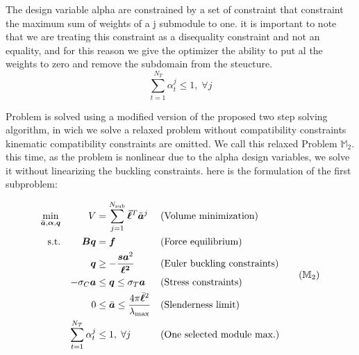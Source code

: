 The design variable alpha are constrained by a set of constraint that constraint the maximum sum of weights of a j submodule to one. it is important to note that we are treating this constraint as a disequality constraint and not an equality, and for this reason we give the optimizer the ability to put al the weights to zero and remove the subdomain from the steucture.
\begin{equation}
    \sum_{t=1}^{N_T} \alpha_t^j \leq 1, \; \forall j 
\end{equation}

Problem  is solved using a modified version of the proposed two step solving algorithm, in wich we solve a relaxed problem without compatibility constraints kinematic compatibility constraints are omitted. We call this relaxed Problem $\mathbb{M}_2$. this time, as the problem is nonlinear due to the alpha design variables, we solve it without linearizing the buckling constraints.  here is the formulation of the first subproblem:

\begin{equation}
    \begin{aligned}
    \min_{\bar{\vect{a}}, \vect{\alpha}, \bm{q}}   && V &= \sum_{j=1}^{N_{\text{sub}}}\vect{\bar{\ell}}^T\tilde{\vect{a}}^j && \textrm{(Volume minimization)}\\
    \textrm{s.t.}   && \bm{B}\bm{q} &= \bm{f} && \textrm{(Force equilibrium)}\\
                    && \bm{q} &\geq -\frac{\bm{s}\bm{a}^2}{\bm{\ell^2}} && \textrm{(Euler buckling constraints)} \\
                    && -\sigma_C\bm{a} &\leq \bm{q} \leq \sigma_T\bm{a} && \textrm{(Stress constraints)} \\
                    && 0 &\leq \bar{\vect{a}} \leq \frac{4 \pi \bar{\vect{\ell}}^2}{\lambda_{\text{max}}} && \textrm{(Slenderness limit)} \\
                    && \sum_{t=1}^{N_T} \alpha_t^j &\leq 1, \; \forall j && \textrm{(One selected module max.)} \\
    \end{aligned}
    \tag{$\mathbb{M}_2$}
    \label{eq:06_optim_relax}
\end{equation}

